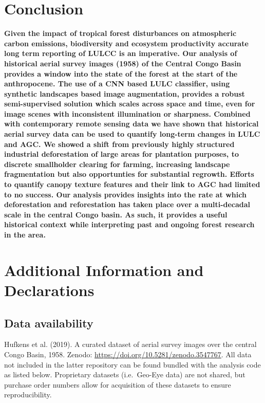 \documentclass[remote sensing,article,submit,moreauthors,pdftex]{mdpi}
\begin{document}
\hypertarget{conclusion}{%
\section{Conclusion}\label{conclusion}}

\textbf{Given the impact of tropical forest disturbances on atmospheric
carbon emissions, biodiversity and ecosystem productivity accurate long
term reporting of LULCC is an imperative. Our analysis of historical
aerial survey images (1958) of the Central Congo Basin provides a window
into the state of the forest at the start of the anthropocene. The use
of a CNN based LULC classifier, using synthetic landscapes based image
augmentation, provides a robust semi-supervised solution which scales
across space and time, even for image scenes with inconsistent
illumination or sharpness. Combined with contemporary remote sensing
data we have shown that historical aerial survey data can be used to
quantify long-term changes in LULC and AGC. We showed a shift from
previously highly structured industrial deforestation of large areas for
plantation purposes, to discrete smallholder clearing for farming,
increasing landscape fragmentation but also opportunties for substantial
regrowth. Efforts to quantify canopy texture features and their link to
AGC had limited to no success. Our analysis provides insights into the
rate at which deforestation and reforestation has taken place over a
multi-decadal scale in the central Congo basin. As such, it provides a
useful historical context while interpreting past and ongoing forest
research in the area.}

\hypertarget{additional-information-and-declarations}{%
\section{Additional Information and
Declarations}\label{additional-information-and-declarations}}

\hypertarget{data-availability}{%
\subsection{Data availability}\label{data-availability}}

Hufkens et al. (2019). A curated dataset of aerial survey images over
the central Congo Basin, 1958. Zenodo:
\url{https://doi.org/10.5281/zenodo.3547767}. All data not included in
the latter repository can be found bundled with the analysis code as
listed below. Proprietary datasets (i.e.~Geo-Eye data) are not shared,
but purchase order numbers allow for acquisition of these datasets to
ensure reproducibility.
\end{document}
